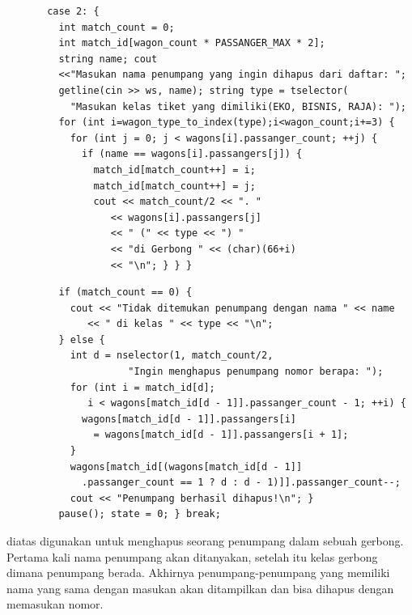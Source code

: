 \documentclass[../main.tex]{subfiles}
\begin{document}
\vspace{-0.55ex}
\begin{lstlisting}
       case 2: {
         int match_count = 0;
         int match_id[wagon_count * PASSANGER_MAX * 2];
         string name; cout
         <<"Masukan nama penumpang yang ingin dihapus dari daftar: ";
         getline(cin >> ws, name); string type = tselector(
           "Masukan kelas tiket yang dimiliki(EKO, BISNIS, RAJA): ");
         for (int i=wagon_type_to_index(type);i<wagon_count;i+=3) {
           for (int j = 0; j < wagons[i].passanger_count; ++j) {
             if (name == wagons[i].passangers[j]) {
               match_id[match_count++] = i;
               match_id[match_count++] = j;
               cout << match_count/2 << ". "
                  << wagons[i].passangers[j]
                  << " (" << type << ") "
                  << "di Gerbong " << (char)(66+i)
                  << "\n"; } } }
\end{lstlisting}
\begin{lstlisting}
         if (match_count == 0) {
           cout << "Tidak ditemukan penumpang dengan nama " << name
              << " di kelas " << type << "\n";
         } else {
           int d = nselector(1, match_count/2,
                     "Ingin menghapus penumpang nomor berapa: ");
           for (int i = match_id[d];
              i < wagons[match_id[d - 1]].passanger_count - 1; ++i) {
             wagons[match_id[d - 1]].passangers[i]
               = wagons[match_id[d - 1]].passangers[i + 1];
           }
           wagons[match_id[(wagons[match_id[d - 1]]
             .passanger_count == 1 ? d : d - 1)]].passanger_count--;
           cout << "Penumpang berhasil dihapus!\n"; }
         pause(); state = 0; } break;
\end{lstlisting}
    \ilz{}{\Script} diatas digunakan untuk menghapus seorang penumpang dalam sebuah gerbong. Pertama kali nama penumpang akan ditanyakan, setelah itu kelas gerbong dimana penumpang berada. Akhirnya penumpang-penumpang yang memiliki nama yang sama dengan masukan akan ditampilkan dan bisa dihapus dengan memasukan nomor.
\end{document}
